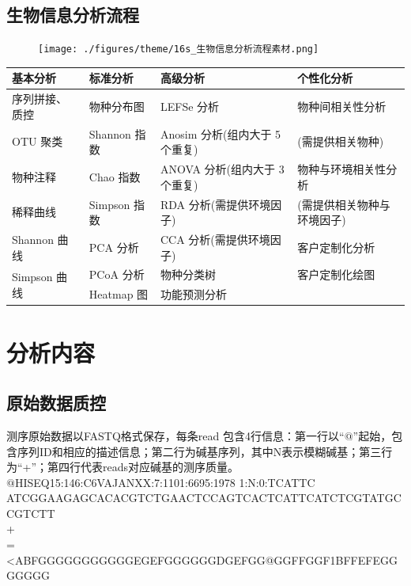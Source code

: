 \documentclass[a4paper,10pt]{article}
\numberwithin{figure}{section}
\numberwithin{table}{section}
\begin{document}
\subsection{生物信息分析流程}
\label{Subsec：bioinformaticAnalyzeFlow}
\begin{figure}[H]
\centering
\label{Fig:bioinformaticAnalyzeFlow111}
 \texttt{[image: ./figures/theme/16s\_生物信息分析流程素材.png]}  
\end{figure}
\begin{table}[H]
\renewcommand\arraystretch{1.0}
\begin{tabular}{|p{}<{\centering}|p{}<{\centering}|p{}<{\centering}|p{}<{\centering}|}
\rowcolor{anjieGreen}
\hline
\textbf{基本分析}&\textbf{标准分析}&\textbf{高级分析}&\textbf{个性化分析}\\
\hline
序列拼接、质控&物种分布图&LEFSe 分析&\multirow{1}{*}{物种间相关性分析}\\
\cline{1-3}
OTU 聚类&Shannon 指数& Anosim 分析(组内大于 5 个重复)&(需提供相关物种)\\
\hline
物种注释& Chao 指数& ANOVA 分析(组内大于 3 个重复)&\multirow{1}{*}{物种与环境相关性分析  }\\
\cline{1-3}
稀释曲线& Simpson 指数& RDA 分析(需提供环境因子)&(需提供相关物种与环境因子)\\
\hline
Shannon 曲线&PCA 分析& CCA 分析(需提供环境因子) &客户定制化分析\\
\hline
\multirow{2}{*}{Simpson 曲线}&PCoA 分析 &物种分类树& 客户定制化绘图\\
\cline{2-4} 
&Heatmap 图 &功能预测分析&\\
\hline
\end{tabular}
\end{table}

\newpage
\section{分析内容}
\label{Sec:Maincontent}
\subsection{原始数据质控}
\label{Subsec:RawDataQualityContral}
测序原始数据以FASTQ格式保存，每条read 包含4行信息：第一行以“$@$”起始，包含序列ID和相应的描述信息；第二行为碱基序列，其中N表示模糊碱基；第三行为“+”；第四行代表reads对应碱基的测序质量。\\
{$@$HISEQ15:146:C6VAJANXX:7:1101:6695:1978 1:N:0:TCATTC\\
ATCGGAAGAGCACACGTCTGAACTCCAGTCACTCATTCATCTCGTATGCCGTCTT\\
+\\
=<ABFGGGGGGGGGGGEGEFGGGGGGDGEFGG@GGFFGGF1BFFEFEGGGGGGG}
\end{document}
